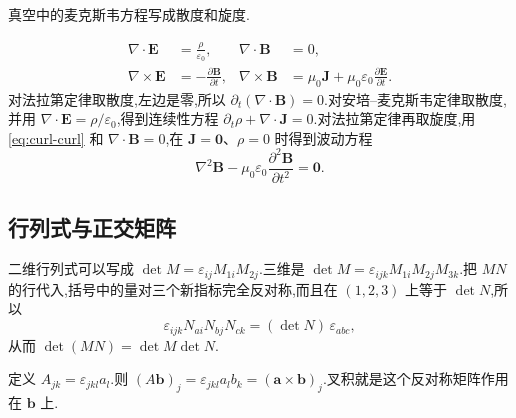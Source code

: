 \begin{example}
真空中的麦克斯韦方程写成散度和旋度.
\end{example}
\begin{solution}
\begin{equation}
\begin{aligned}
  \nabla\cdot\mathbf{E}&=\frac{\rho}{\varepsilon_0}, &
  \nabla\cdot\mathbf{B}&=0, \\
  \nabla\times\mathbf{E}&=-\frac{\partial\mathbf{B}}{\partial t}, &
  \nabla\times\mathbf{B}
  &=\mu_0\mathbf{J}+\mu_0\varepsilon_0\frac{\partial\mathbf{E}}{\partial t}.
\end{aligned}
\end{equation}
对法拉第定律取散度,左边是零,所以 $\partial_t(\nabla\cdot\mathbf{B})=0$.对安培--麦克斯韦定律取散度,并用 $\nabla\cdot\mathbf{E}=\rho/\varepsilon_0$,得到连续性方程 $\partial_t\rho+\nabla\cdot\mathbf{J}=0$.对法拉第定律再取旋度,用\eqref{eq:curl-curl} 和 $\nabla\cdot\mathbf{B}=0$,在 $\mathbf{J}=\mathbf{0}$、$\rho=0$ 时得到波动方程
\begin{equation}
  \nabla^2\mathbf{B}-\mu_0\varepsilon_0\frac{\partial^2\mathbf{B}}{\partial t^2}=\mathbf{0}.
\end{equation}
\end{solution}

\subsection{行列式与正交矩阵}
二维行列式可以写成 $\det M=\varepsilon_{ij}M_{1i}M_{2j}$.三维是 $\det M=\varepsilon_{ijk}M_{1i}M_{2j}M_{3k}$.把 $MN$ 的行代入,括号中的量对三个新指标完全反对称,而且在 $(1,2,3)$ 上等于 $\det N$,所以
\begin{equation}
  \varepsilon_{ijk}N_{ai}N_{bj}N_{ck}=(\det N)\,\varepsilon_{abc},
\end{equation}
从而 $\det(MN)=\det M\det N$.

定义 $A_{jk}=\varepsilon_{jkl}a_l$.则 $(A\mathbf{b})_j=\varepsilon_{jkl}a_l b_k=(\mathbf{a}\times\mathbf{b})_j$.叉积就是这个反对称矩阵作用在 $\mathbf{b}$ 上.

